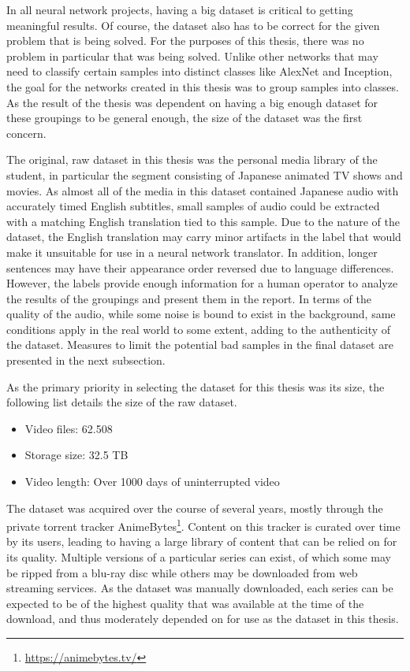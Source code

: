 In all neural network projects, having a big dataset is critical to getting meaningful results.
Of course, the dataset also has to be correct for the given problem that is being solved.
For the purposes of this thesis, there was no problem in particular that was being solved.
Unlike other networks that may need to classify certain samples into distinct classes like AlexNet and Inception, the goal for the networks created in this thesis was to group samples into classes.
As the result of the thesis was dependent on having a big enough dataset for these groupings to be general enough, the size of the dataset was the first concern.

The original, raw dataset in this thesis was the personal media library of the student, in particular the segment consisting of Japanese animated TV shows and movies.
As almost all of the media in this dataset contained Japanese audio with accurately timed English subtitles, small samples of audio could be extracted with a matching English translation tied to this sample.
Due to the nature of the dataset, the English translation may carry minor artifacts in the label that would make it unsuitable for use in a neural network translator.
In addition, longer sentences may have their appearance order reversed due to language differences.
However, the labels provide enough information for a human operator to analyze the results of the groupings and present them in the report.
In terms of the quality of the audio, while some noise is bound to exist in the background, same conditions apply in the real world to some extent, adding to the authenticity of the dataset.
Measures to limit the potential bad samples in the final dataset are presented in the next subsection.


As the primary priority in selecting the dataset for this thesis was its size, the following list details the size of the raw dataset.
\begin{itemize}
    \item Video files: 62.508
    \item Storage size: 32.5 TB 
    \item Video length: Over 1000 days of uninterrupted video
\end{itemize}{}

The dataset was acquired over the course of several years, mostly through the private torrent tracker AnimeBytes\footnote{\url{https://animebytes.tv/}}.
Content on this tracker is curated over time by its users, leading to having a large library of content that can be relied on for its quality.
Multiple versions of a particular series can exist, of which some may be ripped from a blu-ray disc while others may be downloaded from web streaming services.
As the dataset was manually downloaded, each series can be expected to be of the highest quality that was available at the time of the download, and thus moderately depended on for use as the dataset in this thesis.

